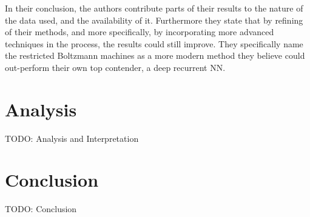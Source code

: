 In their conclusion, the authors contribute parts of their results to the nature of the data used, and the availability of it. Furthermore they state that by refining of their methods, and more specifically, by incorporating more advanced techniques in the process, the results could still improve. They specifically name the restricted Boltzmann machines as a more modern method they believe could out-perform their own top contender, a deep recurrent NN.




\newpage

\section{Analysis}
TODO: Analysis and Interpretation

\newpage

\section{Conclusion}
TODO: Conclusion
